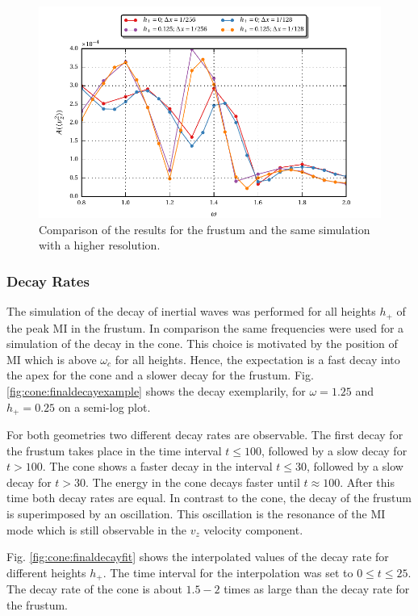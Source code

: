 \begin{figure}[!b]
  \centering
  \includegraphics{gfx/cone/final/hd_comparison.pdf}
  \caption{
      \label{fig:cone:finalhdcomp}
      Comparison of the results for the frustum and the same simulation with a higher resolution.
    }
\end{figure}
\clearpage

\subsubsection{Decay Rates}

The simulation of the decay of inertial waves was performed for  all heights $h_+$ of the peak M\RN{1} in the frustum.
In comparison the same frequencies were used for a simulation of the decay in the cone.
This choice is motivated by the position of M\RN{1} which is above $\omega_c$ for all heights.
Hence, the expectation is a fast decay into the apex for the cone and a slower decay for the frustum.
Fig. \ref{fig:cone:finaldecayexample} shows the decay exemplarily,
for $\omega=1.25$ and $h_+=0.25$ on a semi-log plot.

For both geometries two different decay rates are observable.
The first decay for the frustum takes place in the time interval $t\leq 100$,
followed by a slow decay for $t>100$.
The cone shows a faster decay in the interval $ t\leq 30$, followed by a slow decay for $t>30$.
The energy in the cone decays faster until $t\approx100$. After this time
both decay rates are  equal.  In contrast to the cone, the decay of the frustum  is superimposed by an oscillation.
This oscillation is the resonance of the M\RN{1} mode which is still observable in the $v_z$ velocity component.

Fig. \ref{fig:cone:finaldecayfit} shows the interpolated values of the decay rate for different
heights $h_+$.  The time interval for the interpolation was set to $0 \leq t \leq 25$.
The decay rate of the cone is about $1.5-2$ times as large than the decay rate for the frustum.

